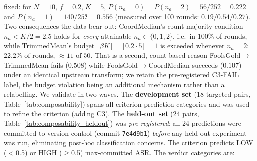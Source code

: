 \documentclass{article}
\begin{document}
fixed: for $N{=}10$, $f{=}0.2$, $K{=}5$, $P(n_a{=}0)=P(n_a{=}2)=56/252=0.222$ and $P(n_a{=}1)=140/252=0.556$ (measured over 100 rounds: $0.19/0.54/0.27$). Two consequences the data bear out: CoordMedian's count-majority condition $n_a < K/2 = 2.5$ holds for \emph{every} attainable $n_a\in\{0,1,2\}$, i.e.\ in 100\% of rounds, while TrimmedMean's budget $\lfloor\beta K\rfloor = \lfloor 0.2\cdot 5\rfloor = 1$ is exceeded whenever $n_a{=}2$: $22.2\%$ of rounds, ${\approx}11$ of 50. That is a second, count-based reason FoolsGold$\to$TrimmedMean fails ($0.508$) while FoolsGold$\to$CoordMedian succeeds ($0.107$) under an identical upstream transform; we retain the pre-registered C3-FAIL label, the budget violation being an additional mechanism rather than a relabelling. We validate in two waves. The \textbf{development set} (18 targeted pairs, Table~\ref{tab:composability}) spans all criterion prediction categories and was used to refine the criterion (adding C3). The \textbf{held-out set} (24 pairs, Table~\ref{tab:composability_heldout}) was \emph{pre-registered}: all 24 predictions were committed to version control (commit \texttt{7e4d9b1}) \emph{before} any held-out experiment was run, eliminating post-hoc classification concerns. The criterion predicts LOW ($<$0.5) or HIGH ($\geq$0.5) max-committed ASR. The verdict categories are:
\end{document}
